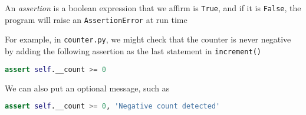 \documentclass[8pt,a4paper,compress,handout]{beamer}
\begin{document}
\begin{frame}[fragile]
An \emph{assertion} is a boolean expression that we affirm is \lstinline{True}, and if it is \lstinline{False}, the program will raise an \lstinline{AssertionError} at run time

\bigskip
For example, in \lstinline{counter.py}, we might check that the counter is never negative by adding the following assertion as the last statement in \lstinline{increment()}
\begin{lstlisting}[language=Python]
assert self.__count >= 0
\end{lstlisting} 

We can also put an optional message, such as
\begin{lstlisting}[language=Python]
assert self.__count >= 0, 'Negative count detected'
\end{lstlisting} 
\end{frame}
\end{document}
